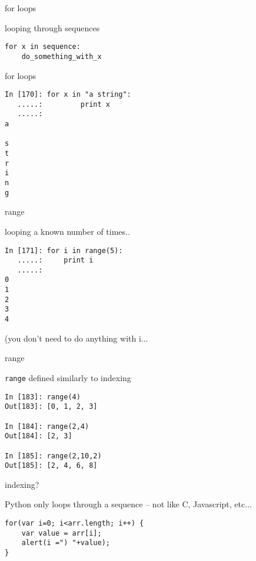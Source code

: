 \documentclass{beamer}
\begin{document}
\begin{frame}[fragile]{for loops}

{\Large looping through sequences

\begin{verbatim}
for x in sequence:
    do_something_with_x
\end{verbatim}
}
\end{frame}

\begin{frame}[fragile]{for loops}

\begin{verbatim}
In [170]: for x in "a string":
   .....:         print x
   .....:     
a
 
s
t
r
i
n
g
\end{verbatim}
\end{frame}

\begin{frame}[fragile]{range}

{\Large looping a known number of times..}

\begin{verbatim}
In [171]: for i in range(5):
   .....:     print i
   .....:     
0
1
2
3
4
\end{verbatim}
(you don't need to do anything with i...
\end{frame}

\begin{frame}[fragile]{range}

{\Large \verb|range| defined similarly to indexing}

\begin{verbatim}
In [183]: range(4)
Out[183]: [0, 1, 2, 3]

In [184]: range(2,4)
Out[184]: [2, 3]

In [185]: range(2,10,2)
Out[185]: [2, 4, 6, 8]
\end{verbatim}

\end{frame}

\begin{frame}[fragile]{indexing?}

{\Large Python only loops through a sequence -- not like C, Javascript, etc...}
\begin{verbatim}
for(var i=0; i<arr.length; i++) {
    var value = arr[i];
    alert(i =") "+value);
}
\end{verbatim}

\end{frame}
\end{document}
